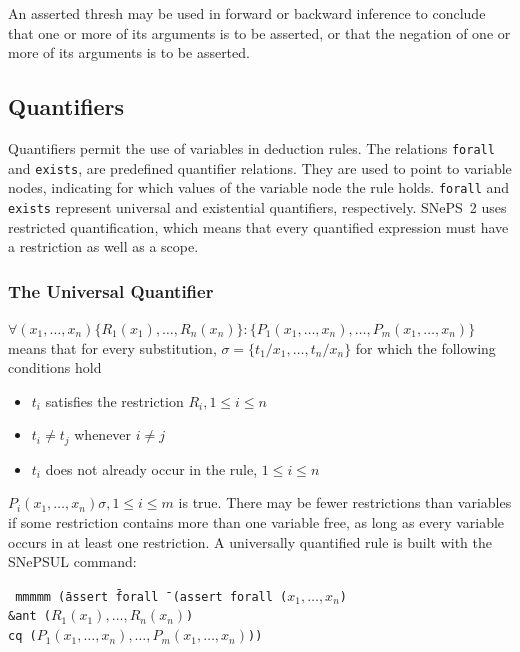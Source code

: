 \documentclass{book}
\begin{document}
An asserted thresh may be used in forward or backward inference to conclude that one or more
of its arguments is to be asserted, or that the negation of one or more of its arguments is to be
asserted.

\subsection{Quantifiers} \label{quantifier-section}

Quantifiers permit the use of variables in deduction rules.  The
relations {\tt forall} and {\tt exists}, are predefined quantifier
relations.  They are used to point to variable nodes, indicating for
which values of the variable node the rule holds.  {\tt forall} and
{\tt exists} represent universal and existential quantifiers,
respectively.  SNePS~2 uses restricted quantification, which means
that every quantified expression must have a restriction as well as a
scope.

\subsubsection{The Universal Quantifier}

$ \forall (x_1, \ldots, x_n) \{R_1(x_1), \ldots, R_n(x_n)\} : \{P_1(x_1, \ldots, x_n), \ldots,
P_m(x_1, \ldots, x_n)\}$ means that for every substitution, $\sigma=\{t_1/x_1, \ldots, t_n/x_n\}$ for which
the following conditions hold
\begin{itemize}
\item $t_i$ satisfies the restriction $R_i, 1 \leq i \leq n$
\item $t_i \neq t_j$ whenever $i \neq j$
\item $t_i$ does not already occur in the rule, $1 \leq i \leq n$
\end{itemize}
$P_i(x_1, \ldots, x_n)\sigma, 1\leq i \leq m$ is true.  There may be fewer restrictions than
variables if some
restriction contains more than one variable free, as long as every variable occurs in at least one
restriction.  A universally quantified rule is built with the SNePSUL command:
\begin{tabbing} \tt
mmmmm \=(assert \=forall \= \kill
      \>(assert \>forall \>($x_1, \ldots, x_n$) \\
      \>        \>\&ant  \> ($R_1(x_1), \ldots, R_n(x_n)$) \\
      \>        \>cq     \>($P_1(x_1, \ldots, x_n), \ldots, P_m(x_1, \ldots, x_n)$))
\end{tabbing}
\end{document}

